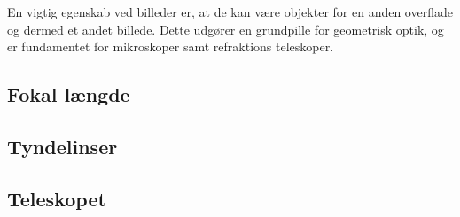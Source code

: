 En vigtig egenskab ved billeder er, at de kan være objekter for en anden overflade og dermed et andet billede. Dette udgører en grundpille for geometrisk optik, og er fundamentet for mikroskoper samt refraktions teleskoper. 

\subsection{Fokal længde}


\subsection{Tyndelinser}

\subsection{Teleskopet}





